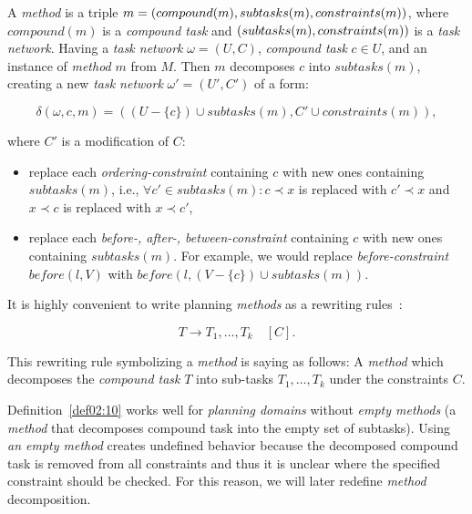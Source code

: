 \begin{defn}\label{def02:10}
    A \emph{method} is a triple $m = (compound(m),subtasks(m), \\ constraints(m))$, where $compound(m)$ is a \emph{compound  task} and $(subtasks(m), \\ constraints(m))$ is a \emph{task network}. Having a \emph{task network} $\omega=(U,C)$, \emph{compound task} $c \in U$, and an instance of \emph{method} $m$ from $M$. Then $m$ decomposes $c$ into $subtasks(m)$, creating a new \emph{task network} $\omega'=(U',C')$ of a form:

    \[
    \delta(\omega,c,m) = ((U-\{c\}) \cup subtasks(m), C' \cup constraints(m)),
    \]

    \noindent
    where $C'$ is a modification of $C$:

    \begin{itemize}
        \item replace each \emph{ordering-constraint} containing $c$ with new ones containing $subtasks(m)$, i.e., $\forall c' \in subtasks(m): c \prec x$ is replaced with $c' \prec x$ and $x \prec c$ is replaced with $x \prec c'$,
        
        \item replace each \emph{before-, after-, between-constraint} containing $c$ with new ones containing $subtasks(m)$. For example, we would replace \emph{before-constraint} $before(l,V)$ with $before(l,(V - \{c\}) \cup subtasks(m))$.
    \end{itemize}
\end{defn}

\medbreak\noindent
It is highly convenient to write planning \emph{methods} as a rewriting rules~\cite{ondrckova2023semantics}:

\[
T \rightarrow T_1,\dots,T_k \quad [C].
\]

\noindent
This rewriting rule symbolizing a \emph{method} is saying as follows: A \emph{method} which decomposes the \emph{compound task} $T$ into sub-tasks $T_1,\dots,T_k$ under the constraints $C$.

\medbreak\noindent
Definition~\ref{def02:10} works well for \emph{planning domains} without \emph{empty methods} (a \emph{method} that decomposes compound task into the empty set of subtasks). Using \emph{an empty method} creates undefined behavior because the decomposed compound task is removed from all constraints and thus it is unclear where the specified constraint should be checked. For this reason, we will later redefine \emph{method} decomposition. 

